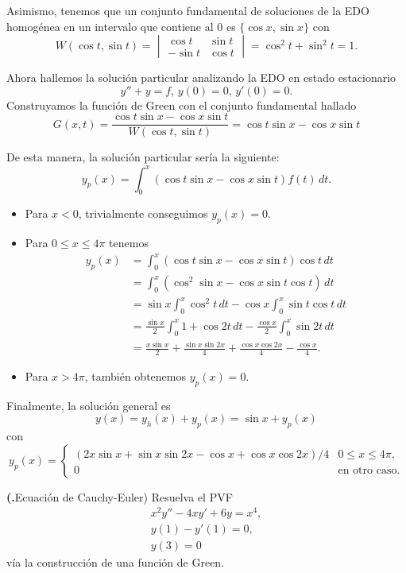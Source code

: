 \documentclass{article}
\newenvironment{statement}[1]{\smallskip\noindent\color[rgb]{1.00,0.00,0.50} {\bf #1.}}{}
\theoremstyle{definition}
\theoremstyle{remark}
\begin{document}
Asimismo, tenemos que un conjunto fundamental de soluciones de la EDO
homog\'enea en un intervalo que contiene al $0$ es $\{\cos x, \sin x\}$ con
\[
  W(\cos t, \sin t) =
  \begin{vmatrix}
    \cos t & \sin t\\
    -\sin t & \cos t
  \end{vmatrix}
  = \cos^2 t + \sin^2 t = 1.
\]

Ahora hallemos la soluci\'on particular analizando la EDO en estado estacionario
\[
  y'' + y = f,\, y(0) = 0,\, y'(0) = 0.  
\]
Construyamos la funci\'on de Green con el conjunto fundamental hallado
\[
  G(x, t) = \frac{\cos t \sin x - \cos x \sin t}{W(\cos t, \sin t)}
  = \cos t \sin x - \cos x \sin t
\]

De esta manera, la soluci\'on particular ser\'ia la siguiente:
\[
  y_p(x) = \int_0^x (\cos t \sin x - \cos x \sin t) f(t) \, dt.  
\]

\begin{itemize}
  \item Para $x < 0$, trivialmente conseguimos $y_p(x) = 0$.
  \item Para $0 \leq x \leq 4\pi$ tenemos
  \begin{align*}
    y_p(x) &= \int_0^x (\cos t \sin x - \cos x \sin t) \cos t \, dt\\
    &= \int_0^x (\cos^2 \sin x - \cos x \sin t \cos t) \, dt\\
    &= \sin x \int_0^x \cos^2 t \, dt - \cos x \int_0^x \sin t \cos t \, dt\\
    &= \frac{\sin x}{2} \int_0^x 1 + \cos 2t \, dt
    - \frac{\cos x}{2} \int_0^x \sin 2t \, dt\\
    &= \frac{x \sin x}{2} + \frac{\sin x \sin 2x}{4} + \frac{\cos x \cos 2x}{4} - \frac{\cos x}{4}.
  \end{align*}
  \item Para $x > 4\pi$, tambi\'en obtenemos $y_p(x) = 0$.
\end{itemize}

Finalmente, la soluci\'on general es
\[
  y(x) = y_h(x) + y_p(x) = \sin x + y_p(x)
\]
con
\[
    y_p(x) =
    \begin{cases}
      (2x\sin x + \sin x \sin 2x - \cos x + \cos x \cos 2x) / 4 & 0 \leq x \leq 4\pi,\\
      0 & \text{en otro caso}.
    \end{cases}  
\]

\begin{statement}{10}
  (Ecuaci\'on de Cauchy-Euler)
  Resuelva el PVF
  \begin{gather*}
    x^2 y'' - 4xy' + 6y = x^4,\\
    y(1) - y'(1) = 0,\\
    y(3) = 0
  \end{gather*}
  v\'ia la construcci\'on de una funci\'on de Green.
\end{statement}
\end{document}
